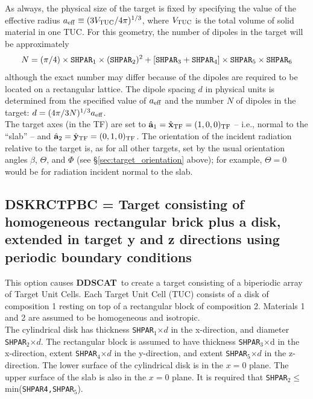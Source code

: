 	    As always, the physical size of the target is fixed by
	    specifying the value of the effective radius
	    ${a}_{\rm eff}\equiv(3V_{\rm TUC}/4\pi)^{1/3}$,
	    where $V_{\rm TUC}$ 
	    is the total volume of solid material in one TUC.
	    For this geometry, the number of dipoles in the target will
	    be approximately
	    $$N=
	    (\pi/4)\times{\tt SHPAR}_1\times({\tt SHPAR}_2)^2+
	    [{\tt SHPAR}_3+{\tt SHPAR}_4]
	    \times{\tt SHPAR}_5\times{\tt SHPAR}_6 $$
	    although the exact number may differ because of the
	    dipoles are required to be located on a rectangular lattice.
	    The dipole spacing $d$ in physical units
	    is determined from the specified value of ${a}_{\rm eff}$ and
	    the number $N$ of dipoles in the target:
	    $d=(4\pi/3N)^{1/3}{a}_{\rm eff}$.\\
	The target axes (in the TF) 
	are set to ${\hat{\bf a}}_1 = \hat{\bf x}_{\rm TF} = (1,0,0)_{\rm TF}$ --
	i.e., normal to the ``slab'' -- and
	${\hat{\bf a}}_2 = \hat{\bf y}_{\rm TF}= (0,1,0)_{\rm TF}$.
	The orientation of the incident radiation relative to the target
	is, as for all other targets, set by the usual orientation
	angles $\beta$, $\Theta$, and $\Phi$ 
	(see \S\ref{sec:target_orientation} above); for example,
	$\Theta=0$ would be for radiation incident normal to the slab.

\subsection{ DSKRCTPBC = Target consisting of homogeneous rectangular brick plus
                     a disk, 
                     extended in
                     target y and z directions using
                     periodic boundary conditions}
            \label{sec:DSKRCTPBC}
            This option causes {{\bf DDSCAT}}\ to create a target consisting
	    of a biperiodic array of Target Unit Cells.  Each Target
	    Unit Cell (TUC) consists of a disk of composition 1
	    resting on top of a rectangular block of composition 2.
	    Materials 1 and 2 are assumed to be homogeneous and isotropic.
	    \ \\
	    The cylindrical disk has thickness {\tt SHPAR$_1$}$\times d$ in the
	    x-direction, and diameter {\tt SHPAR$_2$}$\times d$.
	    The rectangular block is assumed to have thickness
	    {\tt SHPAR}$_3$$\times$d in the x-direction,
	    extent {\tt SHPAR}$_4$$\times d$ in the y-direction,
	    and extent {\tt SHPAR}$_5$$\times d$ in the z-direction.
	    The lower surface of the cylindrical disk is in the $x=0$ plane.
	    The upper surface of the slab is also in the $x=0$ plane.
	    It is required that 
            {\tt SHPAR$_2$}$\leq$min({\tt SHPAR4,SHPAR}$_5$).

